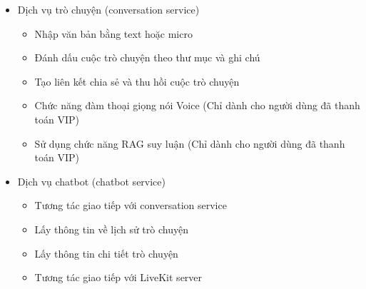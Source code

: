 \begin{itemize}

\item Dịch vụ trò chuyện (conversation service)

\begin{itemize}

\item Nhập văn bản bằng text hoặc micro
\item Đánh dấu cuộc trò chuyện theo thư mục và ghi chú
\item Tạo liên kết chia sẻ và thu hồi cuộc trò chuyện
\item Chức năng đàm thoại giọng nói Voice (Chỉ dành cho người dùng đã thanh toán VIP)
\item Sử dụng chức năng RAG suy luận (Chỉ dành cho người dùng đã thanh toán VIP)
\end{itemize}

\item Dịch vụ chatbot (chatbot service)

\begin{itemize}

\item Tương tác giao tiếp với conversation service
\item Lấy thông tin về lịch sử trò chuyện
\item Lấy thông tin chi tiết trò chuyện
\item Tương tác giao tiếp với LiveKit server
\end{itemize}

\end{itemize}
